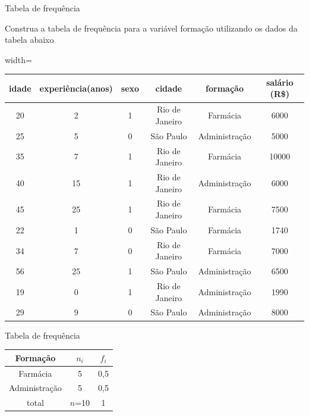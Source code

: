 \begin{frame}{Tabela de frequência}

\begin{exemplo}
    Construa a tabela de frequência para a variável formação utilizando os dados da tabela abaixo
\end{exemplo}


\begin{table}[H]
\centering
\begin{adjustbox}{width=\textwidth}
\begin{tabular}{|c|c|c|c|c|c|}
\hline
idade & experiência(anos) & sexo & cidade         & formação               & salário (R\$) \\ \hline
20    & 2                 & 1    & Rio de Janeiro & Farmácia          & 6000          \\ \hline
25    & 5                 & 0    & São Paulo      & Administração & 5000          \\ \hline
35    & 7                 & 1    & Rio de Janeiro & Farmácia          & 10000         \\ \hline
40    & 15                & 1    & Rio de Janeiro & Administração & 6000          \\ \hline
45    & 25                & 1    & Rio de Janeiro & Farmácia          & 7500          \\ \hline
22    & 1                 & 0    & São Paulo      & Farmácia          & 1740          \\ \hline
34    & 7                 & 0    & Rio de Janeiro & Farmácia          & 7000          \\ \hline
56    & 25                & 1    & São Paulo      & Administração & 6500          \\ \hline
19    & 0                 & 1    & Rio de Janeiro & Administração & 1990          \\ \hline
29    & 9                 & 0    & São Paulo      & Administração & 8000          \\ \hline
\end{tabular}
\end{adjustbox}
\end{table}

\end{frame}


\begin{frame}{Tabela de frequência}
\begin{table}[H]
\begin{tabular}{|c|c|c|}
\hline
Formação               & $n_i$  & $f_i$ \\ \hline
Farmácia          & 5      & 0,5   \\ \hline
Administração & 5      & 0,5   \\ \hline
total                  & $n$=10 & 1     \\ \hline
\end{tabular}
\end{table}
\end{frame}

